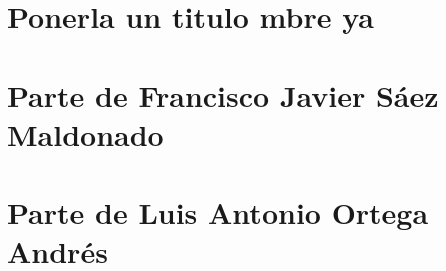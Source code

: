 \documentclass[11pt]{article}
\begin{document}
\section{Ponerla un titulo mbre ya}

\section{Parte de Francisco Javier Sáez Maldonado}

 \newpage

\section{Parte de Luis Antonio Ortega Andrés}

 \newpage
 \newpage
 \newpage
 \newpage
 \newpage
 \newpage
\end{document}
